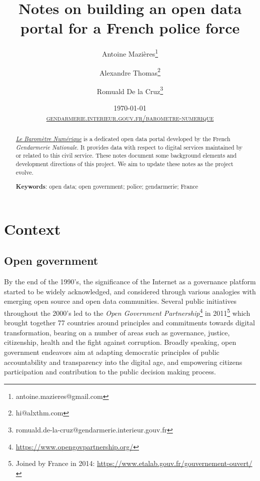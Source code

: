 \documentclass[11pt,a4paper,twocolumn,USenglish]{article}
\title{Notes on building an open data portal for a French police force}
\author[1,2]{Antoine Mazi\`eres\thanks{antoine.mazieres@gmail.com}}
\author[1,2]{Alexandre Thomas\thanks{hi@alxthm.com}}
\author[1,2]{Romuald De la Cruz\thanks{romuald.de-la-cruz@gendarmerie.interieur.gouv.fr}}
\affil[1]{Gendarmerie Nationale, General Directorate (\textsc{dggn}), Issy-les-Moulineaux, France.}
\affil[2]{Public Interest Entrepreneurs program (\textsc{eig}), Interministerial Directorate of Digital Affairs (\textsc{dinum}), Paris, France.}
\date{
\monthyeardate\today\\ \vspace{.5cm}
\href{https://www.gendarmerie.interieur.gouv.fr/barometre-numerique/}{\small{\textsc{gendarmerie.interieur.gouv.fr/barometre-numerique}}}
}
\begin{document}
\hypersetup{linkcolor= MidnightBlue,citecolor= MidnightBlue,filecolor=black,urlcolor= MidnightBlue}


\maketitle

\begin{abstract}

\href{https://www.gendarmerie.interieur.gouv.fr/barometre-numerique/}{\emph{Le Baromètre Numérique}} is a dedicated open data portal developed by the French \emph{Gendarmerie Nationale}. It provides data with respect to digital services maintained by or related to this civil service. These notes document some background elements and development directions of this project.  We aim to update these notes as the project evolve.

\vspace{1em}
\textbf{Keywords}: open data; open government; police; gendarmerie; France\vspace{1em}

\end{abstract}


\section*{Context}

\subsection*{Open government}

By the end of the 1990's, the significance of the Internet as a governance platform started to be widely acknowledged, and considered through various analogies with emerging open source and open data communities. Several public initiatives throughout the 2000's led to the \emph{Open Government Partnership}\footnote{\url{https://www.opengovpartnership.org/}} in 2011\footnote{Joined by France in 2014: \url{https://www.etalab.gouv.fr/gouvernement-ouvert/}} which brought together 77 countries around principles and commitments towards digital transformation, bearing on a number of areas such as governance, justice, citizenship, health and the fight against corruption. Broadly speaking, open government endeavors aim at adapting democratic principles of public accountability and transparency into the digital age, and empowering citizens participation and contribution to the public decision making process.
\end{document}
